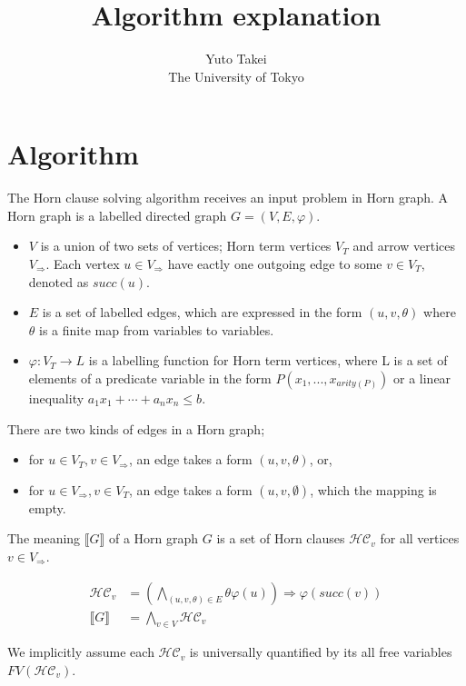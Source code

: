 \documentclass[a4paper,12pt]{article}
\title{Algorithm explanation}
\author{Yuto Takei \\ The University of Tokyo}
\begin{document}
\maketitle

\section{Algorithm}

The Horn clause solving algorithm receives an input problem in Horn
graph. A Horn graph is a labelled directed graph $G=(V,E,\varphi)$.
\begin{itemize}
\item $V$ is a union of two sets of vertices; Horn term vertices $V_T$
  and arrow vertices $V_\Rightarrow$. Each vertex $u \in
  V_\Rightarrow$ have eactly one outgoing edge to some $v \in V_T$,
  denoted as $succ(u)$.
\item $E$ is a set of labelled edges, which are expressed in the form
  $(u,v,\theta)$ where $\theta$ is a finite map from variables to
  variables.
\item $\varphi: V_T \rightarrow L$ is a labelling function for Horn
  term vertices, where L is a set of elements of a predicate variable
  in the form $P(x_1, ..., x_{arity(P)})$ or a linear inequality $a_1
  x_1 + \cdots + a_n x_n \leq b$.
\end{itemize}

There are two kinds of edges in a Horn graph;
\begin{itemize}
\item for $u \in V_T, v \in V_\Rightarrow$, an edge takes a form
  $(u,v,\theta)$, or,
\item for $u \in V_\Rightarrow, v \in V_T$, an edge takes a form
  $(u,v,\emptyset)$, which the mapping is empty.
\end{itemize}

The meaning $\llbracket G \rrbracket $ of a Horn graph $G$ is a set of
Horn clauses $\mathcal{HC}_v$ for all vertices $v \in V_\Rightarrow$.

\begin{align*}
\mathcal{HC}_v & = \left( \bigwedge_{(u,v,\theta) \in E} \theta \varphi(u) \right) \Longrightarrow \varphi(succ(v)) \\
\llbracket G \rrbracket & = \bigwedge_{v \in V} \mathcal{HC}_v
\end{align*}

We implicitly assume each $\mathcal{HC}_v$ is universally quantified
by its all free variables $FV(\mathcal{HC}_v)$.
\end{document}
